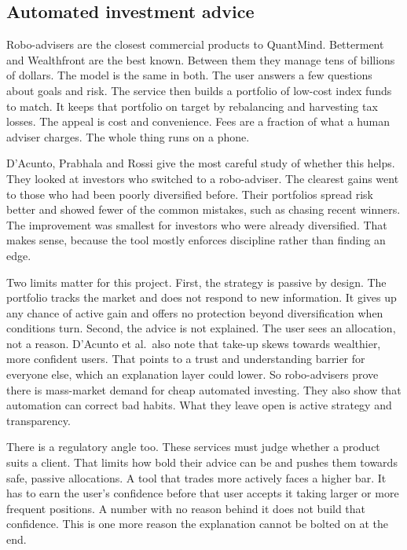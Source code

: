 \documentclass[12pt,twoside,letterpaper]{article}
\begin{document}
\subsection{Automated investment advice}

Robo-advisers are the closest commercial products to QuantMind. Betterment and
Wealthfront are the best known. Between them they manage tens of billions of
dollars. The model is the same in both. The user answers a few questions about
goals and risk. The service then builds a portfolio of low-cost index funds to
match. It keeps that portfolio on target by rebalancing and harvesting tax losses.
The appeal is cost and convenience. Fees are a fraction of what a human adviser
charges. The whole thing runs on a phone.

D'Acunto, Prabhala and Rossi \cite{dacunto2019} give the most careful study of
whether this helps. They looked at investors who switched to a robo-adviser. The
clearest gains went to those who had been poorly diversified before. Their
portfolios spread risk better and showed fewer of the common mistakes, such as
chasing recent winners. The improvement was smallest for investors who were already
diversified. That makes sense, because the tool mostly enforces discipline rather
than finding an edge.

Two limits matter for this project. First, the strategy is passive by design. The
portfolio tracks the market and does not respond to new information. It gives up any
chance of active gain and offers no protection beyond diversification when
conditions turn. Second, the advice is not explained. The user sees an allocation,
not a reason. D'Acunto et al.\ also note that take-up skews towards wealthier, more
confident users. That points to a trust and understanding barrier for everyone
else, which an explanation layer could lower. So robo-advisers prove there is
mass-market demand for cheap automated investing. They also show that automation can
correct bad habits. What they leave open is active strategy and transparency.

There is a regulatory angle too. These services must judge whether a product suits
a client. That limits how bold their advice can be and pushes them towards safe,
passive allocations. A tool that trades more actively faces a higher bar. It has to
earn the user's confidence before that user accepts it taking larger or more
frequent positions. A number with no reason behind it does not build that
confidence. This is one more reason the explanation cannot be bolted on at the end.
\end{document}
